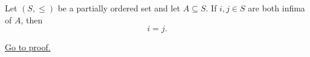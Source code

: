\begin{proposition}
\label{prop:uniqueness-of-the-infimum}
Let $(S,\leq)$ be a partially ordered set and let $A\subseteq S$. If
$i,j\in S$ are both infima of $A$, then
\[
  i=j.
\]

\hyperref[prf:uniqueness-of-the-infimum]{Go to proof.}
\end{proposition}